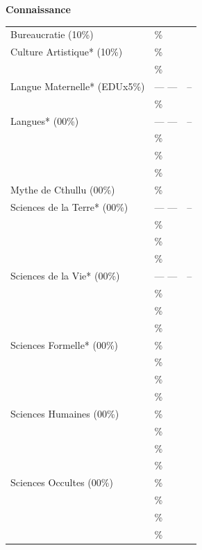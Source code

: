 \documentclass[11pt,twoside,a4paper]{article}
\begin{document}
\begin{multicols}{3}
	\textbf{Connaissance} \hrulefill ~\\  	%
	{\scriptsize \begin{tabular}[c]{ p{4.00cm} p{1.00cm}|c|}
		\cline{3-3}
		Bureaucratie (10\%)		& \dotfill \% & ~ \\
		\cline{3-3}
		Culture Artistique* (10\%)	& \dotfill \% & ~ \\
		\cline{3-3}
		\dotfill			& \dotfill \% & ~ \\
		\cline{3-3}
		Langue Maternelle* (EDUx5\%)	& --- ---	 & -- \\
		\cline{3-3}
		\dotfill			& \dotfill \% & ~ \\
		\cline{3-3}
		Langues* (00\%)			& --- ---	 & -- \\
		\cline{3-3}
		\dotfill			& \dotfill \% & ~ \\
		\cline{3-3}
		\dotfill			& \dotfill \% & ~ \\
		\cline{3-3}
		\dotfill			& \dotfill \% & ~ \\
		\cline{3-3}
		Mythe de Cthullu (00\%)		& \dotfill \% & ~ \\
		\cline{3-3}
		Sciences de la Terre* (00\%)	& --- ---	 & -- \\
		\cline{3-3}
		\dotfill			& \dotfill \% & ~ \\
		\cline{3-3}
		\dotfill			& \dotfill \% & ~ \\
		\cline{3-3}
		\dotfill			& \dotfill \% & ~ \\
		\cline{3-3}
		Sciences de la Vie* (00\%)	& --- ---	 & -- \\
		\cline{3-3}
		\dotfill			& \dotfill \% & ~ \\
		\cline{3-3}
		\dotfill			& \dotfill \% & ~ \\
		\cline{3-3}
		\dotfill			& \dotfill \% & ~ \\
		\cline{3-3}
		Sciences Formelle* (00\%)	& \dotfill \% & ~ \\
		\cline{3-3}
		\dotfill			& \dotfill \% & ~ \\
		\cline{3-3}
		\dotfill			& \dotfill \% & ~ \\
		\cline{3-3}
		\dotfill			& \dotfill \% & ~ \\
		\cline{3-3}
		Sciences Humaines (00\%)	& \dotfill \% & ~ \\
		\cline{3-3}
		\dotfill			& \dotfill \% & ~ \\
		\cline{3-3}
		\dotfill			& \dotfill \% & ~ \\
		\cline{3-3}
		\dotfill			& \dotfill \% & ~ \\
		\cline{3-3}
		Sciences Occultes (00\%)	& \dotfill \% & ~ \\
		\cline{3-3}
		\dotfill			& \dotfill \% & ~ \\
		\cline{3-3}
		\dotfill			& \dotfill \% & ~ \\
		\cline{3-3}
		\dotfill			& \dotfill \% & ~ \\
		\cline{3-3}
	\end{tabular} }~\\
	

\end{multicols}
\end{document}
